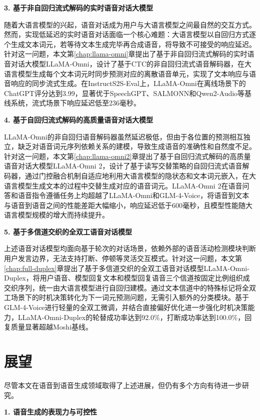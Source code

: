 \textbf{3. 基于非自回归流式解码的实时语音对话大模型}

随着大语言模型的兴起，语音对话成为用户与大语言模型之间最自然的交互方式。然而，实现低延迟的实时语音对话面临一个核心难题：大语言模型以自回归方式逐个生成文本词元，若等待文本生成完毕再合成语音，将导致不可接受的响应延迟。针对这一问题，本文第\ref{chap:llama-omni}章提出了基于非自回归流式解码的实时语音对话大模型LLaMA-Omni，设计了基于CTC的非自回归流式语音解码器，在大语言模型生成每个文本词元时同步预测对应的离散语音单元，实现了文本响应与语音响应的同步流式生成。在InstructS2S-Eval上，LLaMA-Omni在离线场景下的ChatGPT评分达到3.99，显著优于SpeechGPT、SALMONN和Qwen2-Audio等基线系统，流式场景下响应延迟低至236毫秒。

\textbf{4. 基于自回归流式解码的高质量语音对话大模型}

LLaMA-Omni的非自回归语音解码器虽然延迟极低，但由于各位置的预测相互独立，缺乏对语音词元序列依赖关系的建模，导致生成语音的准确性和自然度不足。针对这一问题，本文第\ref{chap:llama-omni2}章提出了基于自回归流式解码的高质量语音对话大模型LLaMA-Omni 2，设计了基于读写交替策略的自回归流式语音解码器，通过门控融合机制自适应地利用大语言模型的隐状态和文本词元嵌入，在大语言模型生成文本的过程中交替生成对应的语音词元。LLaMA-Omni 2在语音问答和语音指令遵循任务上均超越了LLaMA-Omni和GLM-4-Voice，将语音到文本与语音到语音之间的性能差距大幅缩小，响应延迟低于600毫秒，且模型性能随大语言模型规模的增大而持续提升。

\textbf{5. 基于多信道交织的全双工语音对话模型}

上述语音对话模型均面向基于轮次的对话场景，依赖外部的语音活动检测模块判断用户发言边界，无法支持打断、停顿等灵活交互模式。针对这一问题，本文第\ref{chap:full-duplex}章提出了基于多信道交织的全双工语音对话模型LLaMA-Omni-Duplex，将用户语音、模型回复文本和模型回复语音三个信道按固定比例组织成交织序列，统一由大语言模型进行自回归建模。通过文本信道中的特殊标记将全双工场景下的时机决策转化为下一词元预测问题，无需引入额外的分类模块。基于GLM-4-Voice进行轻量的全双工微调，并结合直接偏好优化进一步强化时机决策能力，LLaMA-Omni-Duplex的轮替成功率达到92.0\%，打断成功率达到100.0\%，回复质量显著超越Moshi基线。


\section{展望}

尽管本文在语音到语音生成领域取得了上述进展，但仍有多个方向有待进一步研究。

\textbf{1. 语音生成的表现力与可控性}

